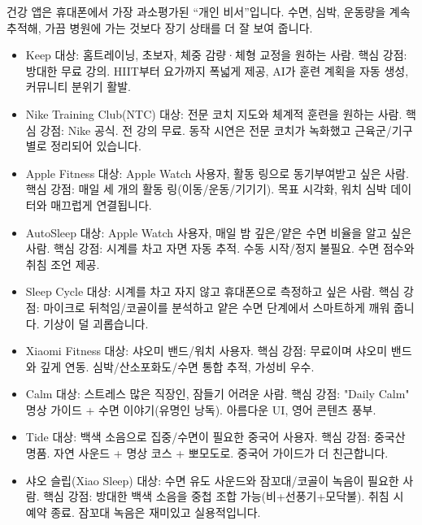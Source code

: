 건강 앱은 휴대폰에서 가장 과소평가된 “개인 비서”입니다. 수면, 심박, 운동량을 계속 추적해, 가끔 병원에 가는 것보다 장기 상태를 더 잘 보여 줍니다.


\begin{itemize}
  \item Keep 대상: 홈트레이닝, 초보자, 체중 감량·체형 교정을 원하는 사람. 핵심 강점: 방대한 무료 강의. HIIT부터 요가까지 폭넓게 제공, AI가 훈련 계획을 자동 생성, 커뮤니티 분위기 활발.
  \item Nike Training Club(NTC) 대상: 전문 코치 지도와 체계적 훈련을 원하는 사람. 핵심 강점: Nike 공식. 전 강의 무료. 동작 시연은 전문 코치가 녹화했고 근육군/기구별로 정리되어 있습니다.
  \item Apple Fitness 대상: Apple Watch 사용자, 활동 링으로 동기부여받고 싶은 사람. 핵심 강점: 매일 세 개의 활동 링(이동/운동/기기기). 목표 시각화, 워치 심박 데이터와 매끄럽게 연결됩니다.
\end{itemize}


\begin{itemize}
  \item AutoSleep 대상: Apple Watch 사용자, 매일 밤 깊은/얕은 수면 비율을 알고 싶은 사람. 핵심 강점: 시계를 차고 자면 자동 추적. 수동 시작/정지 불필요. 수면 점수와 취침 조언 제공.
  \item Sleep Cycle 대상: 시계를 차고 자지 않고 휴대폰으로 측정하고 싶은 사람. 핵심 강점: 마이크로 뒤척임/코골이를 분석하고 얕은 수면 단계에서 스마트하게 깨워 줍니다. 기상이 덜 괴롭습니다.
  \item Xiaomi Fitness 대상: 샤오미 밴드/워치 사용자. 핵심 강점: 무료이며 샤오미 밴드와 깊게 연동. 심박/산소포화도/수면 통합 추적, 가성비 우수.
\end{itemize}


\begin{itemize}
  \item Calm 대상: 스트레스 많은 직장인, 잠들기 어려운 사람. 핵심 강점: "Daily Calm" 명상 가이드 + 수면 이야기(유명인 낭독). 아름다운 UI, 영어 콘텐츠 풍부.
  \item Tide 대상: 백색 소음으로 집중/수면이 필요한 중국어 사용자. 핵심 강점: 중국산 명품. 자연 사운드 + 명상 코스 + 뽀모도로. 중국어 가이드가 더 친근합니다.
  \item 샤오 슬립(Xiao Sleep) 대상: 수면 유도 사운드와 잠꼬대/코골이 녹음이 필요한 사람. 핵심 강점: 방대한 백색 소음을 중첩 조합 가능(비+선풍기+모닥불). 취침 시 예약 종료. 잠꼬대 녹음은 재미있고 실용적입니다.
\end{itemize}

